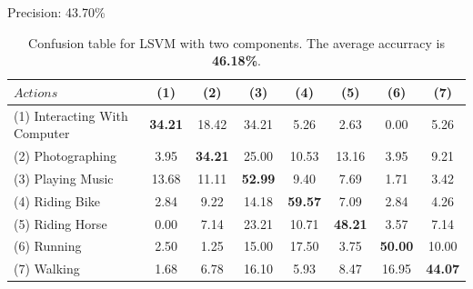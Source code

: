 \documentclass[10pt,a4paper]{llncs}
\begin{document}
Precision: 43.70\%

\begin{table}[H]
\centering
\caption{Confusion table for LSVM with two components. The average accurracy is \textbf{46.18\%}.}
\label{table:LSVM2:Accuracy}
\begin{tabular}{|l|c|c|c|c|c|c|c|}
\hline
$Actions $ & $~~$(1)$~~$ & $~~$(2)$~~$ & $~~$(3)$~~$ & $~~$(4)$~~$ & $~~$(5)$~~$ & $~~$(6)$~~$ & $~~$(7)$~~$ \\ \hline
(1) Interacting With Computer & \cellcolor{lightgray}\textbf{34.21} & 18.42 & 34.21 & 5.26 & 2.63 & 0.00 & 5.26 \\ \hline
(2) Photographing             & 3.95 & \cellcolor{lightgray}\textbf{34.21} & 25.00 & 10.53 & 13.16 & 3.95 & 9.21 \\ \hline
(3) Playing Music             & 13.68 & 11.11 & \cellcolor{lightgray}\textbf{52.99} & 9.40 & 7.69 & 1.71 & 3.42 \\ \hline
(4) Riding Bike               & 2.84 & 9.22 & 14.18 & \cellcolor{lightgray}\textbf{59.57} & 7.09 & 2.84 & 4.26 \\ \hline
(5) Riding Horse              & 0.00 & 7.14 & 23.21 & 10.71 & \cellcolor{lightgray}\textbf{48.21} & 3.57 & 7.14 \\ \hline
(6) Running                   & 2.50 & 1.25 & 15.00 & 17.50 & 3.75 & \cellcolor{lightgray}\textbf{50.00} & 10.00 \\ \hline
(7) Walking                   & 1.68 & 6.78 & 16.10 & 5.93 & 8.47 & 16.95 & \cellcolor{lightgray}\textbf{44.07} \\ \hline

\end{tabular}
\end{table}
\end{document}
